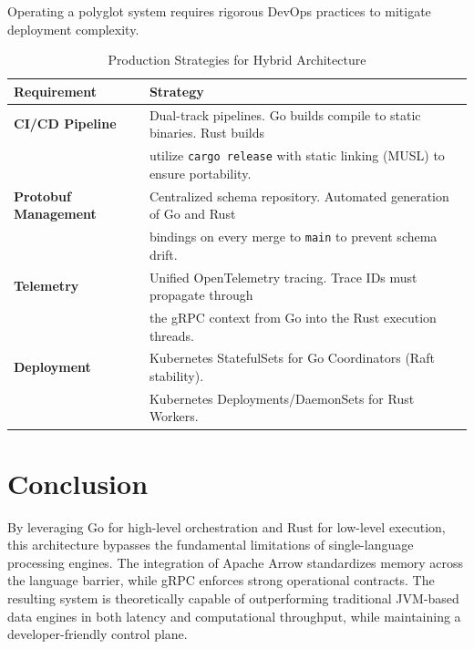 \documentclass[11pt, a4paper]{article}
\begin{document}
Operating a polyglot system requires rigorous DevOps practices to mitigate deployment complexity.

\begin{table}[ht]
\centering
\begin{tabular}{@{}ll@{}}
\toprule
\textbf{Requirement} & \textbf{Strategy} \\ \midrule
\textbf{CI/CD Pipeline} & Dual-track pipelines. Go builds compile to static binaries. Rust builds \\ 
& utilize \texttt{cargo release} with static linking (MUSL) to ensure portability. \\ \addlinespace
\textbf{Protobuf Management} & Centralized schema repository. Automated generation of Go and Rust \\
& bindings on every merge to \texttt{main} to prevent schema drift. \\ \addlinespace
\textbf{Telemetry} & Unified OpenTelemetry tracing. Trace IDs must propagate through \\
& the gRPC context from Go into the Rust execution threads. \\ \addlinespace
\textbf{Deployment} & Kubernetes StatefulSets for Go Coordinators (Raft stability). \\
& Kubernetes Deployments/DaemonSets for Rust Workers. \\ \bottomrule
\end{tabular}
\caption{Production Strategies for Hybrid Architecture}
\end{table}

\section{Conclusion}
By leveraging Go for high-level orchestration and Rust for low-level execution, this architecture bypasses the fundamental limitations of single-language processing engines. The integration of Apache Arrow standardizes memory across the language barrier, while gRPC enforces strong operational contracts. The resulting system is theoretically capable of outperforming traditional JVM-based data engines in both latency and computational throughput, while maintaining a developer-friendly control plane.
\end{document}
